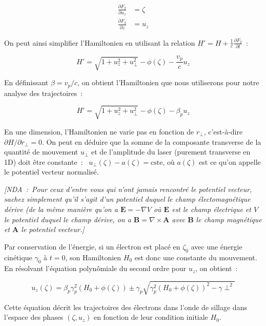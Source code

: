 \documentclass[a4paper]{book}
\begin{document}
\begin{eqnarray*}
    \frac{\partial F_2}{\partial u_z}&=\zeta\\
    \frac{\partial F_2}{\partial z}&=u_z
\end{eqnarray*}

On peut ainsi simplifier l'Hamiltonien en utilisant la relation $H' = H+\frac{1}{c}\frac{\partial F_2}{\partial t}$~:

\begin{equation}
    H'=\sqrt{1+u_z^2+u_\perp^2}-\phi(\zeta)-\frac{v_p}{c}u_z
\end{equation}

En définissant $\beta=v_p/c$, on obtient l'Hamiltonien que nous utiliserons pour notre analyse des trajectoires~:

\begin{equation}
    H'=\sqrt{1+u_z^2+u_\perp^2}-\phi(\zeta)-\beta_p u_z
\end{equation}

En une dimension, l'Hamiltonien ne varie pas en fonction de $r_\perp$, c'est-à-dire $\partial H/\partial r_\perp = 0$. On peut en déduire que la somme de la composante transverse de la quantité de mouvement $u_\perp$ et de l'amplitude du laser (purement transverse en 1D) doit être constante~:~ $u_\perp(\zeta) - a(\zeta) = \mathrm{cste}$, où $a(\zeta)$ est ce qu'on appelle le potentiel vecteur normalisé. 

\textit{[NDA~:~Pour ceux d'entre vous qui n'ont jamais rencontré le potentiel vecteur, sachez simplement qu'il s'agit d'un potentiel duquel le champ électomagnétique dérive (de la même manière qu'on a $\textbf{E} = -\nabla V$ où $\textbf{E}$ est le champ électrique et $V$ le potentiel duquel le champ dérive, on a $\textbf{B} = \nabla\times\textbf{A}$ avec $\textbf{B}$ le champ magnétique et $\textbf{A}$ le potentiel vecteur.]}


Par conservation de l'énergie, si un électron est placé en $\zeta_0$ avec une énergie cinétique $\gamma_0$ à $t=0$, son Hamiltonien $H_0$ est donc une constante du mouvement. En résolvant l'équation polynômiale du second ordre pour $u_z$, on obtient~:

\begin{equation}\label{eqsol}
u_z(\zeta) = \beta_p\gamma_p^2(H_0+\phi(\zeta))\pm\gamma_p\sqrt{\gamma_p^2(H_0+\phi(\zeta))^2-\gamma\perp^2}
\end{equation}

Cette équation décrit les trajectoires des électrons dans l'onde de sillage dans l'espace des phases $(\zeta, u_z)$ en fonction de leur condition initiale $H_0$. 
\end{document}
